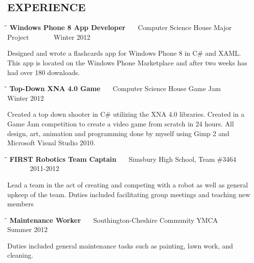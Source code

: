 \documentclass{res}
\begin{document}
\begin{resume}
\section{EXPERIENCE}
   \vspace{-0.05in}	
   \begin{tabbing}%
   \hspace{2.3in}\= \hspace{2.6in}\= \kill %
   {\bf Windows Phone 8 App Developer }  \>~~~Computer Science House Major Project \> ~~~~~~ Winter 2012\\
   \end{tabbing}\vspace{-30pt}
    Designed and wrote a flashcards app for Windows Phone 8 in C\# and XAML. This app is located
    on the Windows Phone Marketplace and after two weeks has had over 180 downloads. 
    \vspace{-5pt}
    \begin{tabbing}%
   \hspace{2.3in}\= \hspace{2.6in}\= \kill %
   {\bf Top-Down XNA 4.0 Game }  \>~~~Computer Science House Game Jam \> ~~~~~~ Winter 2012\\
   \end{tabbing}\vspace{-30pt}
    Created a top down shooter in C\# utilizing the XNA 4.0 libraries. 
    Created in a Game Jam competition to create a video game from scratch in 24 hours. 
    All design, art, animation and programming done by myself using Gimp 2 and Microsoft Visual Studio 2010.
    \vspace{-5pt}
   \begin{tabbing}
   \hspace{2.3in}\= \hspace{2.6in}\= \kill %
    {\bf FIRST Robotics Team Captain} \>~~~Simsbury High School, Team \#3464 \> ~~~~~~ 2011-2012\\
   \end{tabbing}\vspace{-30pt}
    Lead a team in the act of creating and competing with a robot as well as general upkeep of the team.
    Duties included facilitating group meetings and teaching new members 
    \vspace{-5pt}
   \begin{tabbing}%
   \hspace{2.3in}\= \hspace{2.6in}\= \kill %
   {\bf Maintenance Worker }  \>~~~Southington-Cheshire Community YMCA \> ~~~~~~ Summer 2012\\
   \end{tabbing}\vspace{-30pt}
    Duties included general maintenance tasks such as painting, lawn work,
    and cleaning. 
    

\end{resume}
\end{document}
